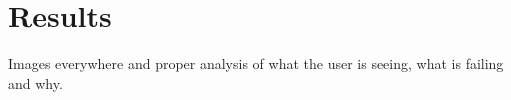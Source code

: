 \chapter{Results}
\label{ch:results}

Images everywhere and proper analysis of what the user is seeing, what is failing and why.